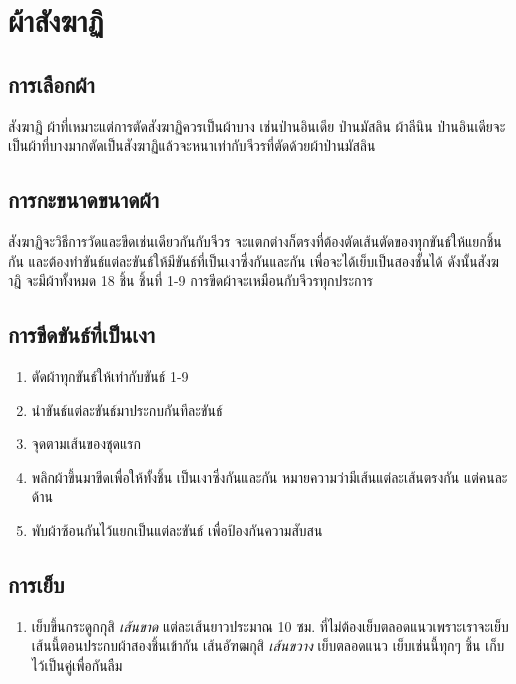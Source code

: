 \chapter{ผ้าสังฆาฏิ}

\section{การเลือกผ้า}

สังฆาฎิ ผ้าที่เหมาะแต่การตัดสังฆาฏิควรเป็นผ้าบาง เช่นป่านอินเดีย
ป่านมัสลิน ผ้าลีนิน
ป่านอินเดียจะเป็นผ้าที่บางมากตัดเป็นสังฆาฏิแล้วจะหนาเท่ากับจีวรที่ตัดด้วยผ้าป่านมัสลิน

\section{การกะขนาดขนาดผ้า}

สังฆาฏิจะวิธีการวัดและขีดเช่นเดียวกันกับจีวร
จะแตกต่างก็ตรงที่ต้องตัดเส้นตัดของทุกขันธ์ให้แยกชิ้นกัน
และต้องทำขันธ์แต่ละขันธ์ให้มีขันธ์ที่เป็นเงาซึ่งกันและกัน
เพื่อจะได้เย็บเป็นสองชั้นได้ ดังนั้นสังฆาฎิ จะมีผ้าทั้งหมด 18 ชิ้น
ชิ้นที่ 1-9 การขีดผ้าจะเหมือนกับจีวรทุกประการ

\section{การขีดขันธ์ที่เป็นเงา}

\begin{enumerate}
\def\labelenumi{(\arabic{enumi})}
\item
  ตัดผ้าทุกขันธ์ให้เท่ากับขันธ์ 1-9
\item
  นำขันธ์แต่ละขันธ์มาประกบกันทีละขันธ์
\item
  จุดตามเส้นของชุดแรก
\item
  พลิกผ้าขึ้นมาขีดเพื่อให้ทั้งชิ้น เป็นเงาซึ่งกันและกัน
  หมายความว่ามีเส้นแต่ละเส้นตรงกัน แต่คนละด้าน
\item
  พับผ้าซ้อนกันไว้แยกเป็นแต่ละขันธ์ เพื่อป้องกันความสับสน
\end{enumerate}

\section{การเย็บ}

\begin{enumerate}
\def\labelenumi{(\arabic{enumi})}
\tightlist
\item
  เย็บขึ้นกระดูกกุสิ \emph{เส้นขาด} แต่ละเส้นยาวประมาณ 10 ซม.
  ที่ไม่ต้องเย็บตลอดแนวเพราะเราจะเย็บเส้นนี้ตอนประกบผ้าสองชิ้นเข้ากัน
  เส้นอัฑฒกุสิ \emph{เส้นขวาง} เย็บตลอดแนว เย็บเช่นนี้ทุกๆ ชิ้น
  เก็บไว้เป็นคู่เพื่อกันลืม
\end{enumerate}

